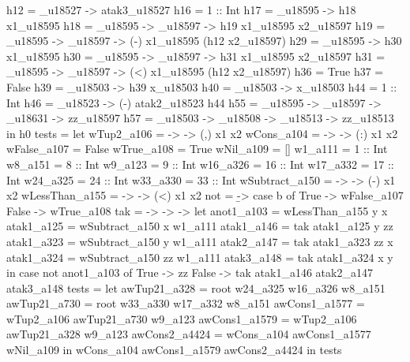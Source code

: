          h12 = _u18527 -> atak3_u18527
         h16 = 1 :: Int
         h17 = _u18595 -> h18 x1_u18595
         h18 = _u18595 -> _u18597 -> h19 x1_u18595 x2_u18597
         h19 = _u18595 -> _u18597 -> (-) x1_u18595 (h12 x2_u18597)
         h29 = _u18595 -> h30 x1_u18595
         h30 = _u18595 -> _u18597 -> h31 x1_u18595 x2_u18597
         h31 = _u18595 -> _u18597 -> (<) x1_u18595 (h12 x2_u18597)
         h36 = True
         h37 = False
         h39 = \x_u18503 -> h39 x_u18503
         h40 = \x_u18503 -> x_u18503
         h44 = 1 :: Int
         h46 = _u18523 -> (-) atak2_u18523 h44
         h55 = \y_u18595 -> \zz_u18597 -> \x_u18631 -> zz_u18597
         h57 = \x_u18503 -> \y_u18508 -> \zz_u18513 -> zz_u18513
       in h0
tests = let
          wTup2_a106 =  ->  -> (,) x1 x2
          wCons_a104 =  ->  -> (:) x1 x2
          wFalse_a107 = False
          wTrue_a108 = True
          wNil_a109 = []
          w1_a111 = 1 :: Int
          w8_a151 = 8 :: Int
          w9_a123 = 9 :: Int
          w16_a326 = 16 :: Int
          w17_a332 = 17 :: Int
          w24_a325 = 24 :: Int
          w33_a330 = 33 :: Int
          wSubtract_a150 =  ->  -> (-) x1 x2
          wLessThan_a155 =  ->  -> (<) x1 x2
          not = \b -> case b of
                        True -> wFalse_a107
                        False -> wTrue_a108
          tak = \x -> \y -> \zz -> let
                                     anot1_a103 = wLessThan_a155 y x
                                     atak1_a125 = wSubtract_a150 x w1_a111
                                     atak1_a146 = tak atak1_a125 y zz
                                     atak1_a323 = wSubtract_a150 y w1_a111
                                     atak2_a147 = tak atak1_a323 zz x
                                     atak1_a324 = wSubtract_a150 zz w1_a111
                                     atak3_a148 = tak atak1_a324 x y
                                   in case not anot1_a103 of
                                        True -> zz
                                        False -> tak atak1_a146 atak2_a147 atak3_a148
          tests = let
                    awTup21_a328 = root w24_a325 w16_a326 w8_a151
                    awTup21_a730 = root w33_a330 w17_a332 w8_a151
                    awCons1_a1577 = wTup2_a106 awTup21_a730 w9_a123
                    awCons1_a1579 = wTup2_a106 awTup21_a328 w9_a123
                    awCons2_a4424 = wCons_a104 awCons1_a1577 wNil_a109
                  in wCons_a104 awCons1_a1579 awCons2_a4424
        in tests

